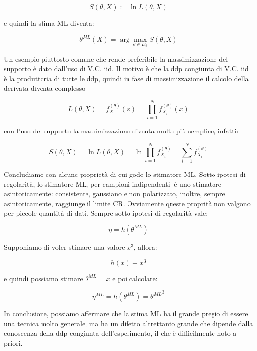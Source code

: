   \[ S(\theta,X):= \ln L(\theta,X)  \]
  
e quindi la stima ML diventa:

  \[ \theta^{ML}(X)=\arg \max_{\theta \in D_\theta} S(\theta,X)  \]
  
Un esempio piuttosto comune che rende preferibile la massimizzazione del supporto è dato dall'uso di V.C. iid. Il motivo è che la ddp congiunta di V.C. iid è la produttoria di tutte le ddp, quindi in fase di massimizzazione il calcolo della derivata diventa complesso:

  \[ L(\theta,X)=f_X^{(\theta)}(x)=\prod_{i=1}^{N}  f_{X_i}^{(\theta)}(x)  \]
  
con l'uso del supporto la massimizzazione diventa molto più semplice, infatti:

  \[ S(\theta,X)= \ln L(\theta,X )= \ln \prod_{i=1}^{N}  f_{X_i}^{(\theta)}  =  \sum_{i=1}^{N}   f_{X_i}^{(\theta)} \]
  
Concludiamo con alcune proprietà di cui gode lo stimatore ML. Sotto ipotesi di regolarità, lo stimatore ML, per campioni indipendenti, è uno stimatore asintoticamente: consistente, gaussiano e non polarizzato, inoltre, sempre asintoticamente, raggiunge il limite CR. Ovviamente queste proprità non valgono per piccole quantità di dati.
Sempre sotto ipotesi di regolarità vale:

  \[ \eta = h(\theta^{ML}) \]

\begin{esempio}  
Supponiamo di voler stimare una valore $x^3$, allora:

  \[ h(x)=x^3 \]
  
e quindi possiamo stimare $\theta^{ML} = x$ e poi calcolare:

  \[ \eta^{ML} = h(\theta^{ML})={\theta^{ML}}^3 \]
\end{esempio}

In conclusione, possiamo affermare che la stima ML ha il grande pregio di essere una tecnica molto generale, ma ha un difetto altrettanto grande che dipende dalla conoscenza della ddp congiunta dell'esperimento, il che è difficilmente noto a priori.
